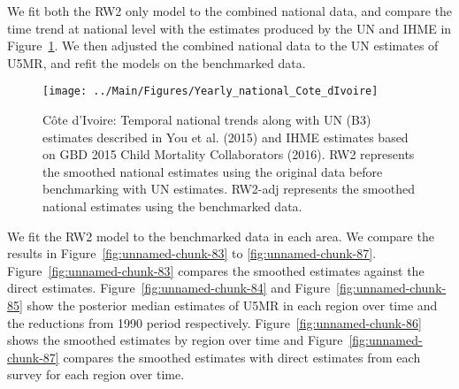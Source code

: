 \documentclass[12pt]{article}\usepackage[]{graphicx}\usepackage[]{color}
\newenvironment{knitrout}{}{} %
\begin{document}
We fit both the RW2 only model to the combined national data, and compare the time trend at national level with the estimates produced by the UN and IHME in Figure~\ref{fig:unnamed-chunk-82}. We then adjusted the combined national data to the UN estimates of U5MR, and refit the models on the benchmarked data. 

\begin{knitrout}
\color{fgcolor}\begin{figure}[bht]

{\centering \texttt{[image: ../Main/Figures/Yearly\_national\_Cote\_dIvoire]} 

}

\caption[C\^{o}te d'Ivoire]{C\^{o}te d'Ivoire: Temporal national trends along with UN (B3) estimates described in You et al. (2015) and IHME estimates based on GBD 2015 Child Mortality Collaborators (2016). RW2 represents the smoothed national estimates using the original data before benchmarking with UN estimates. RW2-adj represents the smoothed national estimates using the benchmarked data.}\label{fig:unnamed-chunk-82}
\end{figure}


\end{knitrout}
 

We fit the RW2 model to the benchmarked data in each area. 
We compare the results in Figure~\ref{fig:unnamed-chunk-83} to \ref{fig:unnamed-chunk-87}.
Figure~\ref{fig:unnamed-chunk-83} compares the smoothed estimates against the direct estimates. Figure~\ref{fig:unnamed-chunk-84} and Figure~\ref{fig:unnamed-chunk-85} show the posterior median estimates of U5MR in each region over time and the reductions from 1990 period respectively.
Figure~\ref{fig:unnamed-chunk-86} shows the smoothed estimates by region over time and Figure~\ref{fig:unnamed-chunk-87} compares the smoothed estimates with direct estimates from each survey for each region over time.




\end{document}
